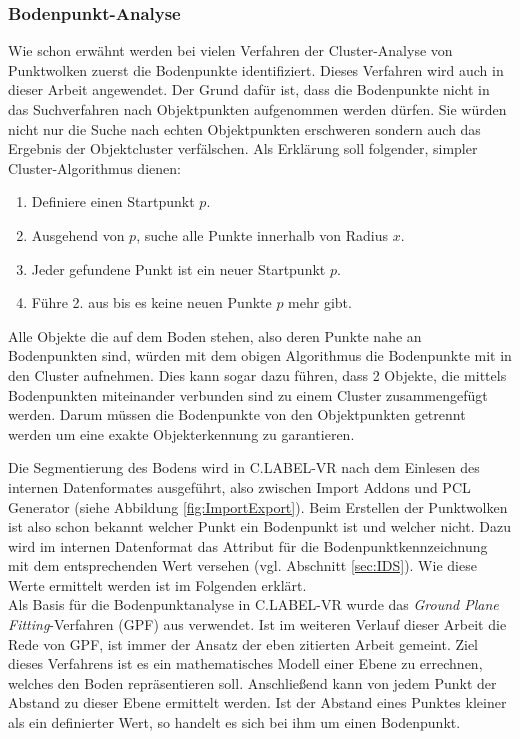 \subsubsection{Bodenpunkt-Analyse}
Wie schon erwähnt werden bei vielen Verfahren der Cluster-Analyse von Punktwolken zuerst die Bodenpunkte identifiziert. Dieses Verfahren wird auch in dieser Arbeit angewendet. Der Grund dafür ist, dass die Bodenpunkte nicht in das Suchverfahren nach Objektpunkten aufgenommen werden dürfen. Sie würden nicht nur die Suche nach echten Objektpunkten erschweren sondern auch das Ergebnis der Objektcluster verfälschen. Als Erklärung soll folgender, simpler Cluster-Algorithmus dienen:

\begin{enumerate}
\item Definiere einen Startpunkt $p$.
\item Ausgehend von $p$, suche alle Punkte innerhalb von Radius \(x\). 
\item Jeder gefundene Punkt ist ein neuer Startpunkt $p$.
\item Führe 2. aus bis es keine neuen Punkte $p$ mehr gibt.
\end{enumerate} 

Alle Objekte die auf dem Boden stehen, also deren Punkte nahe an Bodenpunkten sind, würden mit dem obigen Algorithmus die Bodenpunkte mit in den Cluster aufnehmen. Dies kann sogar dazu führen, dass 2 Objekte, die mittels Bodenpunkten miteinander verbunden sind zu einem Cluster zusammengefügt werden. Darum müssen die Bodenpunkte von den Objektpunkten getrennt werden um eine exakte Objekterkennung zu garantieren.

Die Segmentierung des Bodens wird in C.LABEL-VR nach dem Einlesen des internen Datenformates ausgeführt, also zwischen Import Addons und PCL Generator (siehe Abbildung \ref{fig:ImportExport}). Beim Erstellen der Punktwolken ist also schon bekannt welcher Punkt ein Bodenpunkt ist und welcher nicht. Dazu wird im internen Datenformat das Attribut für die Bodenpunktkennzeichnung mit dem entsprechenden Wert versehen (vgl. Abschnitt \ref{sec:IDS}). Wie diese Werte ermittelt werden ist im Folgenden erklärt.\\

Als Basis für die Bodenpunktanalyse in C.LABEL-VR wurde das \textit{Ground Plane Fitting}-Verfahren (GPF) aus \cite{bib:Segmentation1} verwendet. Ist im weiteren Verlauf dieser Arbeit die Rede von GPF, ist immer der Ansatz der eben zitierten Arbeit gemeint. Ziel dieses Verfahrens ist es ein mathematisches Modell einer Ebene zu errechnen, welches den Boden repräsentieren soll. Anschließend kann von jedem Punkt der Abstand zu dieser Ebene ermittelt werden. Ist der Abstand eines Punktes kleiner als ein definierter Wert, so handelt es sich bei ihm um einen Bodenpunkt.

